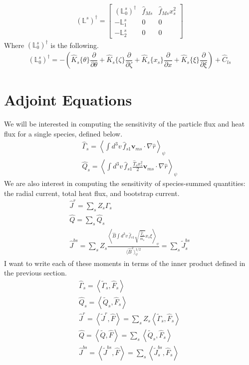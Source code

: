 \documentclass[11pt]{amsart}
\newcommand{\partder}[2]{\dfrac{\partial #1}{\partial #2}} %
\begin{document}
\begin{gather}
(\mathbb{L}^s)^{\dagger} = 
\begin{bmatrix}
(\mathbb{L}_0^s)^{\dagger} & \hat{f}_{Ms} & \hat{f}_{Ms} x_s^2 \\
- \mathbb{L}_1^s & 0 & 0 \\
- \mathbb{L}_2^s & 0 & 0 
\end{bmatrix}
\end{gather}
Where $(\mathbb{L}_0^s)^{\dagger}$ is the following.
\begin{gather}
(\mathbb{L}_0^s)^{\dagger} = - \left( \hat{K}_s\{\theta\} \partder{}{\theta} + \hat{K}_s\{\zeta\} \partder{}{\zeta} + \hat{K}_s \{x_s\} \partder{}{x} + \hat{K}_s \{\xi\} \partder{}{\xi}\right) + \hat{C}_{ls}
\end{gather}

\section{Adjoint Equations}
We will be interested in computing the sensitivity of the particle flux and heat flux for a single species, defined below. 
\begin{gather}
\hat{\Gamma}_{s} = \left \langle \int d^3 v \, \hat{f}_{s1} \bm{v}_{ms} \cdot \nabla \hat{r} \right \rangle_{\psi} \\
\hat{Q}_{s} = \left \langle \int d^3 v \, \hat{f}_{s1} \frac{\hat{T}_s x_s^2 }{2} \bm{v}_{ms} \cdot \nabla \hat{r} \right \rangle_{\psi} 
\end{gather}
We are also interest in computing the sensitivity of species-summed quantities: the radial current, total heat flux, and bootstrap current. 
\begin{gather}
\hat{J}^r = \sum_s Z_s \Gamma_{s} \\
\hat{Q} = \sum_s \hat{Q}_s \\
\hat{J}^{bs} = \sum_s Z_s \frac{\left \langle \hat{B} \int d^3 v \, \hat{f}_{s1} \sqrt{\frac{\hat{T}_s}{\hat{m}_s}}x_s \xi \right \rangle_{\psi} }{\langle \hat{B}^2 \rangle_{\psi}^{1/2}} = \sum_s \tilde{J}^{bs}_s
\end{gather}
I want to write each of these moments in terms of the inner product defined in the previous section.  
\begin{gather}
\hat{\Gamma}_{s} = \left \langle \tilde{\Gamma}_{s}, \hat{F}_s \right \rangle \\
\hat{Q}_s = \left \langle \tilde{Q}_s, \hat{F}_s \right \rangle \\
\hat{J}^r = \left \langle \tilde{J}^r, \hat{F} \right \rangle = \sum_s Z_s \left \langle \tilde{\Gamma}_{s}, \hat{F}_s \right \rangle \\
\hat{Q} = \left \langle \tilde{Q}, \hat{F} \right \rangle = \sum_s \left \langle \tilde{Q}_s, \hat{F}_s \right \rangle \\
\hat{J}^{bs} = \left \langle \tilde{J}^{bs}, \hat{F} \right \rangle = \sum_s \left \langle \tilde{J}^{bs}_s, \hat{F}_s \right \rangle
\end{gather}
\end{document}

